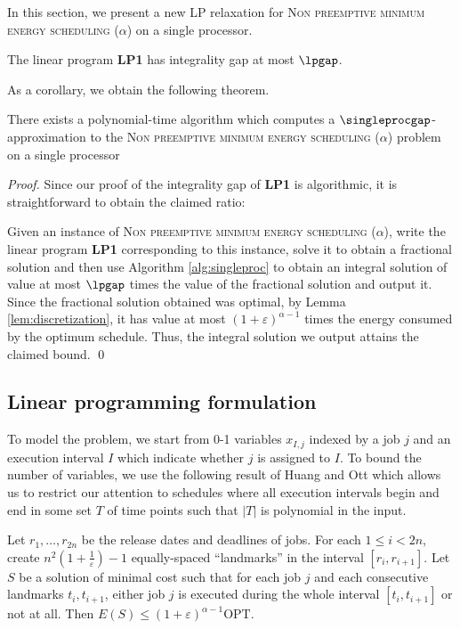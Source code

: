 In this section, we present a new LP relaxation for \textsc{Non preemptive minimum energy scheduling ($\alpha$)} on a single processor. 
\begin{thm}\label{thm:intgap}
The linear program  \textbf{LP1} has integrality gap at most $\lpgap$.
\end{thm}
As a corollary, we obtain the following theorem. 
 

\begin{thm}\label{thm:existsingproc}
  There exists a polynomial-time algorithm which computes a $\singleprocgap$-approximation to the \textsc{Non preemptive minimum energy scheduling ($\alpha$)} problem on a single processor
\end{thm}
\begin{proof}
Since our proof of the integrality gap of \textbf{LP1} is algorithmic, it is straightforward to obtain the claimed ratio:

Given an instance of \textsc{Non preemptive minimum energy scheduling ($\alpha$)}, write the linear program \textbf{LP1} corresponding to this instance, solve it to obtain a fractional solution and then use Algorithm \ref{alg:singleproc} to obtain an integral solution of value at most $\lpgap$ times the value of the fractional solution and output it. Since the fractional solution obtained was optimal, by Lemma \ref{lem:discretization}, it has value at most $(1+\varepsilon)^{\alpha-1}$ times the energy consumed by the optimum schedule. Thus, the integral solution we output attains the claimed bound.
\qed \end{proof}

\subsection{Linear programming formulation}

To model the problem, we start from 0-1 variables $x_{I,j}$ indexed by a job $j$ and an execution interval $I$ which indicate whether $j$ is assigned to $I$. To bound the number of variables, we use the following result of Huang and Ott \cite{Huang_Ott} which allows us to restrict our attention to schedules where all execution intervals begin and end in some set  $T$ of time points such that $|T|$ is  polynomial in the input.



\begin{lem}\label{lem:discretization}\cite{Huang_Ott}
    Let $r_1,\ldots,r_{2n}$ be the release dates and deadlines of jobs.
    For each $1 \le i < 2n$, create $n^2 (1 + \frac{1}{\varepsilon}) -1$ equally-spaced ``landmarks'' in the interval $[r_i, r_{i+1}]$.
    Let $S$ be a solution of minimal cost such that for each job $j$ and each consecutive landmarks $t_i, t_{i+1}$, either
    job $j$ is executed during the whole interval $[t_i, t_{i+1}]$ or not at all.
    Then $E(S) \le (1 + \varepsilon)^{\alpha - 1} \text{OPT}$.
\end{lem}


